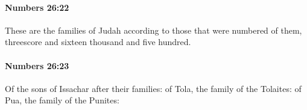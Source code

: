 		\paragraph{Numbers 26:22} %
			\label{NUMBERS-26-22}

			These are the families of Judah according to those that were numbered of them, threescore and sixteen thousand and five hundred.


		\paragraph{Numbers 26:23} %
			\label{NUMBERS-26-23}

			Of the sons of Issachar after their families: of Tola, the family of the Tolaites: of Pua, the family of the Punites:



